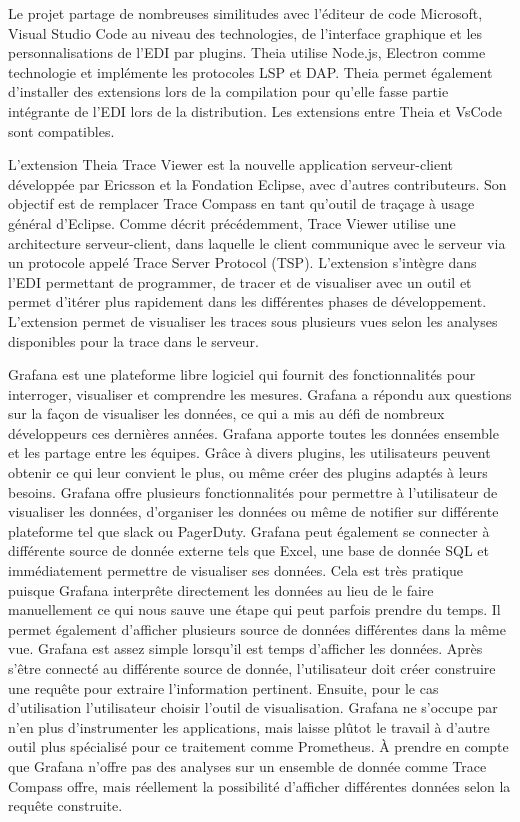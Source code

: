 Le projet partage de nombreuses similitudes avec l'éditeur de code Microsoft, Visual Studio Code au niveau des technologies, de l'interface graphique et les personnalisations de l'EDI par plugins. Theia utilise Node.js, Electron comme technologie et implémente les protocoles LSP et DAP. Theia permet également d'installer des extensions lors de la compilation pour qu'elle fasse partie intégrante de l'EDI lors de la distribution. Les extensions entre Theia et VsCode sont compatibles.

L'extension Theia Trace Viewer est la nouvelle application serveur-client développée par Ericsson et la Fondation Eclipse, avec d'autres contributeurs. Son objectif est de remplacer Trace Compass en tant qu'outil de traçage à usage général d'Eclipse. Comme décrit précédemment, Trace Viewer utilise une architecture serveur-client, dans laquelle le client communique avec le serveur via un protocole appelé Trace Server Protocol (TSP). \cite{desnoyers2006lttng} L'extension s'intègre dans l'EDI permettant de programmer, de tracer et de visualiser avec un outil et permet d'itérer plus rapidement dans les différentes phases de développement. L'extension permet de visualiser les traces sous plusieurs vues selon les analyses disponibles pour la trace dans le serveur.


Grafana est une plateforme libre logiciel qui fournit des fonctionnalités pour interroger, visualiser et comprendre les mesures. Grafana a répondu aux questions sur la façon de visualiser les données, ce qui a mis au défi de nombreux développeurs ces dernières années. Grafana apporte toutes les données ensemble et les partage entre les équipes. Grâce à divers plugins, les utilisateurs peuvent obtenir ce qui leur convient le plus, ou même créer des plugins adaptés à leurs besoins. Grafana offre plusieurs fonctionnalités pour permettre à l'utilisateur de visualiser les données, d'organiser les données ou même de notifier sur différente plateforme tel que slack ou PagerDuty. Grafana peut également se connecter à différente source de donnée externe tels que Excel, une base de donnée SQL et immédiatement permettre de visualiser ses données. Cela est très pratique puisque Grafana interprête directement les données au lieu de le faire manuellement ce qui nous sauve une étape qui peut parfois prendre du temps. Il permet également d'afficher plusieurs source de données différentes dans la même vue. Grafana est assez simple lorsqu'il est temps d'afficher les données. Après s'être connecté au différente source de donnée, l'utilisateur doit créer construire une requête pour extraire l'information pertinent. Ensuite, pour le cas d'utilisation l'utilisateur choisir l'outil de visualisation. \cite{do2021data} Grafana ne s'occupe par n'en plus d'instrumenter les applications, mais laisse plûtot le travail à d'autre outil plus spécialisé pour ce traitement comme Prometheus. À prendre en compte que Grafana n'offre pas des analyses sur un ensemble de donnée comme Trace Compass offre, mais réellement la possibilité d'afficher différentes données selon la requête construite.


